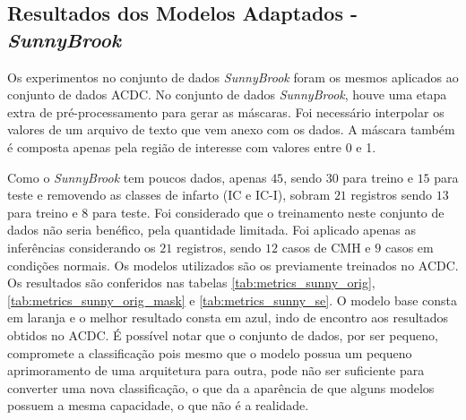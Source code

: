 \subsection{Resultados dos Modelos Adaptados - \textit{SunnyBrook}}
\label{subsec:resultados_sunny_adaptado}

Os experimentos no conjunto de dados \textit{SunnyBrook} foram os mesmos aplicados ao conjunto de dados \gls{ACDC}. No conjunto de dados \textit{SunnyBrook}, houve uma etapa extra de pré-processamento para gerar as máscaras. Foi necessário interpolar os valores de um arquivo de texto que vem anexo com os dados. A máscara também é composta apenas pela região de interesse com valores entre 0 e 1.

Como o \textit{SunnyBrook} tem poucos dados, apenas $45$, sendo $30$ para treino e $15$ para teste e removendo as classes de infarto (IC e IC-I), sobram $21$ registros sendo $13$ para treino e $8$ para teste. Foi considerado que o treinamento neste conjunto de dados não seria benéfico, pela quantidade limitada. Foi aplicado apenas as inferências considerando os $21$ registros, sendo $12$ casos de \gls{CMH} e $9$ casos em condições normais. Os modelos utilizados são os previamente treinados no \gls{ACDC}. Os resultados são conferidos nas tabelas \ref{tab:metrics_sunny_orig}, \ref{tab:metrics_sunny_orig_mask} e \ref{tab:metrics_sunny_se}. O modelo base consta em laranja e o melhor resultado consta em azul, indo de encontro aos resultados obtidos no \gls{ACDC}. É possível notar que o conjunto de dados, por ser pequeno, compromete a classificação pois mesmo que o modelo possua um pequeno aprimoramento de uma arquitetura para outra, pode não ser suficiente para converter uma nova classificação, o que da a aparência de que alguns modelos possuem a mesma capacidade, o que não é a realidade.


